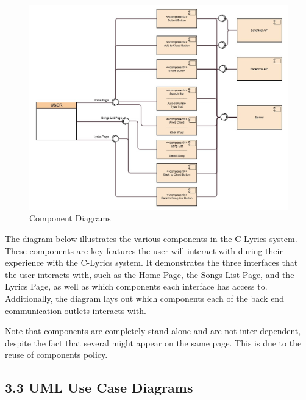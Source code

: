 \documentclass[]{article}
\begin{document}
\begin{figure}[htbp]
\centering
\includegraphics{component_diagram_2.jpg}
\caption{Component Diagrams}
\end{figure}

The diagram below illustrates the various components in the C-Lyrics
system. These components are key features the user will interact with
during their experience with the C-Lyrics system. It demonstrates the
three interfaces that the user interacts with, such as the Home Page,
the Songs List Page, and the Lyrics Page, as well as which components
each interface has access to. Additionally, the diagram lays out which
components each of the back end communication outlets interacts with.

Note that components are completely stand alone and are not inter-dependent, despite the fact that several might appear on the same page. This is due to the reuse of components policy.

\subsection{3.3 UML Use Case Diagrams}\label{uml-use-case-diagrams}
\end{document}
